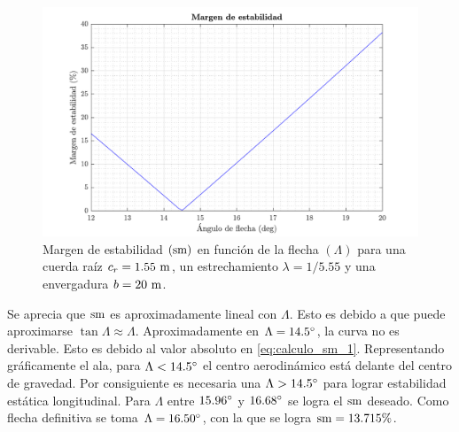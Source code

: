 \begin{figure}[ht]
    \centering
    \includegraphics[width=\linewidth]{imagenes/ajuste_flecha/stability_margin.pdf}
    \caption{Margen de estabilidad $\left( \sm \right)$ en función de la flecha $\left( \Lambda \right)$ para una cuerda raíz $c_r = 1.55 \ \meter$, un estrechamiento $\lambda = 1 / 5.55$ y una envergadura $b = 20 \ \meter$.}
    \label{fig:stability_margin}
    \vspace{-4mm}
\end{figure}

Se aprecia que $\sm$ es aproximadamente lineal con $\Lambda$. Esto es debido a que puede aproximarse $\tan{\Lambda} \approx \Lambda$. Aproximadamente en $\Lambda = 14.5\degrees$, la curva no es derivable. Esto es debido al valor absoluto en \eqref{eq:calculo_sm_1}. Representando gráficamente el ala, para $\Lambda < 14.5\degrees$ el centro aerodinámico está delante del centro de gravedad. Por consiguiente es necesaria una $\Lambda > 14.5\degrees$ para lograr estabilidad estática longitudinal. Para $\Lambda$ entre $15.96\degrees$ y $16.68\degrees$ se logra el $\sm$ deseado. Como flecha definitiva se toma $\Lambda = 16.50\degrees$, con la que se logra $\sm = 13.715\%$. 


